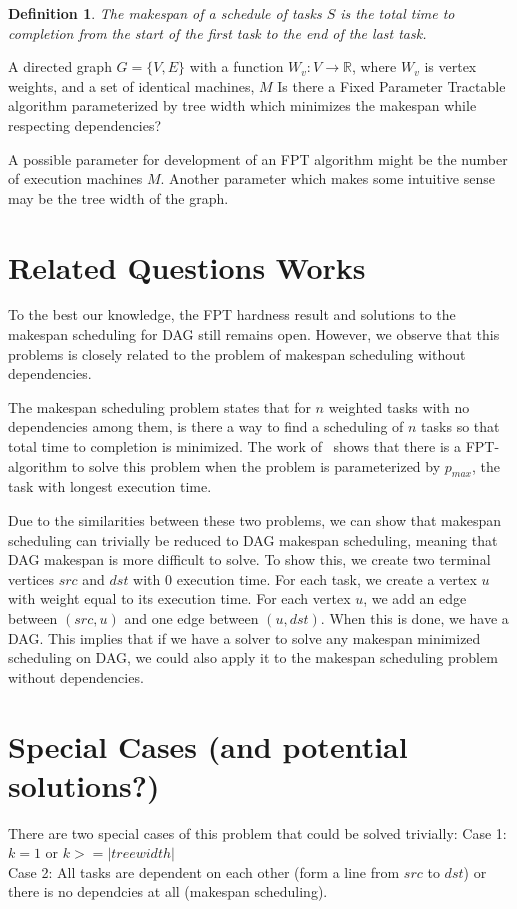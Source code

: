 \documentclass{article}
\newtheorem{definition}{Definition}
\begin{document}
\begin{definition}
The \emph{makespan} of a schedule of tasks $S$ is the total time to completion
from the start of the first task to the end of the last task.
\end{definition}


%
{A directed graph $G = \{V, E\}$ with a function $W_v: V \to \mathbb{R}$,
 where $W_v$ is vertex weights, and a set of identical machines,
$M$}%
{}%
{Is there a Fixed Parameter Tractable algorithm parameterized by tree width
which  minimizes the makespan while respecting
dependencies?}%

A possible parameter for development of an FPT algorithm might be the number of
execution machines $M$. Another parameter which makes some intuitive sense may
be the tree width of the graph.

\section{Related Questions Works}
To the best our knowledge, the FPT hardness result and solutions to the
makespan scheduling for DAG still remains open.
However, we observe that this problems is closely related to the problem of
makespan scheduling without dependencies.

The makespan scheduling problem states that for $n$ weighted tasks with no
dependencies among them, is there a way to find a scheduling of $n$
tasks so that total time to completion is minimized. The work of~\cite{mnich2015scheduling}
shows that there is a FPT-algorithm to solve this problem
when the problem is parameterized by $p_{max}$, the task with longest
execution time.

Due to the similarities between these two problems, we can show that makespan
scheduling can trivially be reduced to DAG makespan scheduling, meaning
that DAG makespan is more difficult to solve. To show this,
we create two terminal vertices $src$ and $dst$ with 0 execution time. For each
task, we create a vertex $u$ with weight equal to its execution time. For each
vertex $u$, we add an edge between $(src,u)$ and one edge between $(u,dst)$.
When this is done, we have a DAG.
This implies that if we have a solver to solve any makespan minimized
scheduling on DAG, we could also apply it to the makespan scheduling problem
without dependencies.

\section{Special Cases (and potential solutions?)}
There are two special cases of this problem that could be solved trivially:
Case 1: $k = 1$ or $k >= |treewidth|$ \\
Case 2: All tasks are dependent on each other (form a line from $src$ to $dst$)
or there is no dependcies at all (makespan scheduling).



\end{document}
